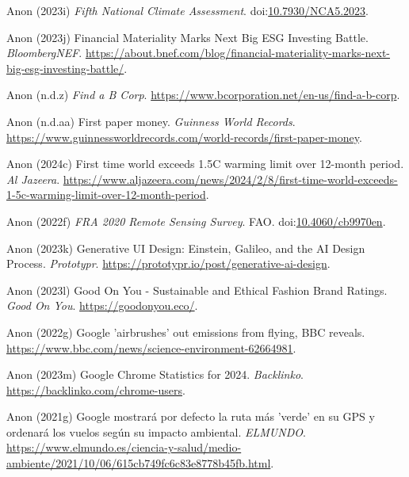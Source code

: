 \documentclass[
  letterpaper,
  DIV=11,
  numbers=noendperiod]{scrartcl}
\newlength{\cslhangindent}
\newenvironment{CSLReferences}[2] %
 {\begin{list}{}{%
  \setlength{\itemindent}{0pt}
  \setlength{\leftmargin}{0pt}
  \setlength{\parsep}{0pt}
  \ifodd #1
   \setlength{\leftmargin}{\cslhangindent}
   \setlength{\itemindent}{-1\cslhangindent}
  \fi
  \setlength{\itemsep}{#2\baselineskip}}}
 {\end{list}}
\begin{document}
\begin{CSLReferences}{0}{1}
Anon (2023i) \emph{Fifth {National Climate Assessment}}.
doi:\href{https://doi.org/10.7930/NCA5.2023}{10.7930/NCA5.2023}.

Anon (2023j) Financial {Materiality Marks Next Big ESG Investing
Battle}. \emph{BloombergNEF}.
\url{https://about.bnef.com/blog/financial-materiality-marks-next-big-esg-investing-battle/}.

Anon (n.d.z) \emph{Find a {B Corp}}.
\url{https://www.bcorporation.net/en-us/find-a-b-corp}.

Anon (n.d.aa) First paper money. \emph{Guinness World Records}.
\url{https://www.guinnessworldrecords.com/world-records/first-paper-money}.

Anon (2024c) First time world exceeds 1.{5C} warming limit over 12-month
period. \emph{Al Jazeera}.
\url{https://www.aljazeera.com/news/2024/2/8/first-time-world-exceeds-1-5c-warming-limit-over-12-month-period}.

Anon (2022f) \emph{{FRA} 2020 {Remote Sensing Survey}}. FAO.
doi:\href{https://doi.org/10.4060/cb9970en}{10.4060/cb9970en}.

Anon (2023k) Generative {UI Design}: {Einstein}, {Galileo}, and the {AI
Design Process}. \emph{Prototypr}.
\url{https://prototypr.io/post/generative-ai-design}.

Anon (2023l) Good {On You} - {Sustainable} and {Ethical Fashion Brand
Ratings}. \emph{Good On You}. \url{https://goodonyou.eco/}.

Anon (2022g) Google 'airbrushes' out emissions from flying, {BBC}
reveals. \url{https://www.bbc.com/news/science-environment-62664981}.

Anon (2023m) Google {Chrome Statistics} for 2024. \emph{Backlinko}.
\url{https://backlinko.com/chrome-users}.

Anon (2021g) {Google mostrar{á} por defecto la ruta m{á}s 'verde' en su
GPS y ordenar{á} los vuelos seg{ú}n su impacto ambiental}.
\emph{ELMUNDO}.
\url{https://www.elmundo.es/ciencia-y-salud/medio-ambiente/2021/10/06/615cb749fc6c83e8778b45fb.html}.


\end{CSLReferences}
\end{document}
